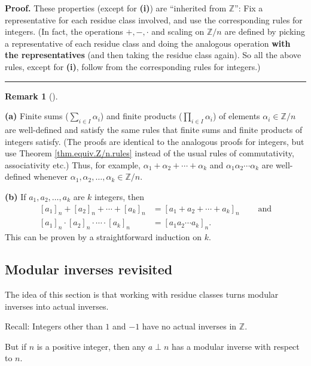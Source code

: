 \documentclass[numbers=enddot,12pt,final,onecolumn,notitlepage]{scrartcl}%
\numberwithin{exer}{subsection}
\theoremstyle{definition}
\newtheorem{remk}[theo]{Remark}
\newenvironment{remark}[1][]
{\begin{remk}[#1]\begin{leftbar}}
{\end{leftbar}\end{remk}}
\newenvironment{proof}[1][Proof]{\noindent\textbf{#1.} }{\ \rule{0.5em}{0.5em}}
\let\sumnonlimits\sum
\let\prodnonlimits\prod
\renewcommand{\sum}{\sumnonlimits\limits}
\renewcommand{\prod}{\prodnonlimits\limits}
\begin{document}
\begin{proof}
These properties (except for \textbf{(i)}) are \textquotedblleft inherited
from $\mathbb{Z}$\textquotedblright: Fix a representative for each residue
class involved, and use the corresponding rules for integers. (In fact, the
operations $+,-,\cdot$ and scaling on $\mathbb{Z}/n$ are defined by picking a
representative of each residue class and doing the analogous operation
\textbf{with the representatives} (and then taking the residue class again).
So all the above rules, except for \textbf{(i)}, follow from the corresponding
rules for integers.)
\end{proof}

\begin{remark}
\textbf{(a)} Finite sums ($\sum_{i\in I}\alpha_{i}$) and finite products
($\prod_{i\in I}\alpha_{i}$) of elements $\alpha_{i}\in\mathbb{Z}/n$ are
well-defined and satisfy the same rules that finite sums and finite products
of integers satisfy. (The proofs are identical to the analogous proofs for
integers, but use Theorem \ref{thm.equiv.Z/n.rules} instead of the usual rules
of commutativity, associativity etc.) Thus, for example, $\alpha_{1}%
+\alpha_{2}+\cdots+\alpha_{k}$ and $\alpha_{1}\alpha_{2}\cdots\alpha_{k}$ are
well-defined whenever $\alpha_{1},\alpha_{2},\ldots,\alpha_{k}\in\mathbb{Z}/n$.

\textbf{(b)} If $a_{1},a_{2},\ldots,a_{k}$ are $k$ integers, then
\begin{align*}
\left[  a_{1}\right]  _{n}+\left[  a_{2}\right]  _{n}+\cdots+\left[
a_{k}\right]  _{n}  &  =\left[  a_{1}+a_{2}+\cdots+a_{k}\right]
_{n}\ \ \ \ \ \ \ \ \ \ \text{and}\\
\left[  a_{1}\right]  _{n}\cdot\left[  a_{2}\right]  _{n}\cdot\cdots
\cdot\left[  a_{k}\right]  _{n}  &  =\left[  a_{1}a_{2}\cdots a_{k}\right]
_{n}.
\end{align*}
This can be proven by a straightforward induction on $k$.
\end{remark}

\subsection{Modular inverses revisited}

The idea of this section is that working with residue classes turns modular
inverses into actual inverses.

Recall: Integers other than $1$ and $-1$ have no actual inverses in
$\mathbb{Z}$.

But if $n$ is a positive integer, then any $a\perp n$ has a modular inverse
with respect to $n$.
\end{document}
